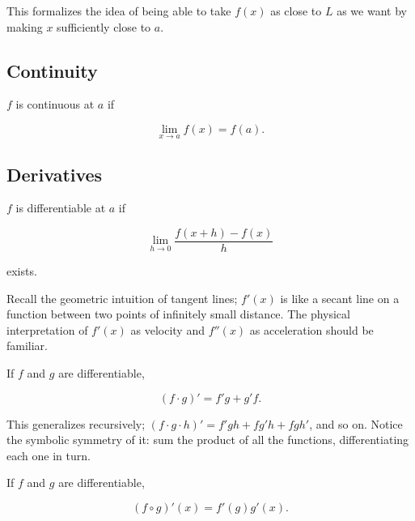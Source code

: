 \documentclass{article}
\begin{document}
This formalizes the idea of being able to take $f(x)$ as close to $L$ as we want
by making $x$ sufficiently close to $a$.

\subsection{Continuity}

\begin{definition}

$f$ is continuous at $a$ if

\begin{equation}
\lim_{x \to a} f(x) = f(a).
\end{equation}

\end{definition}

\subsection{Derivatives}

\begin{definition} 
$f$ is differentiable at $a$ if

\begin{equation}
\lim_{h \to 0} \frac{f(x+h) - f(x)}{h}
\end{equation}

exists.
\end{definition}

Recall the geometric intuition of tangent lines; $f'(x)$ is like a secant line
on a function between two points of infinitely small distance. The physical
interpretation of $f'(x)$ as velocity and $f''(x)$ as acceleration should be familiar.

\begin{theorem} 

If $f$ and $g$ are differentiable, 

\begin{equation}
(f \cdot g)' = f'g + g'f.
\end{equation}


\end{theorem} 

This generalizes recursively; $(f \cdot g \cdot h)' = f'gh + fg'h + fgh'$, and
so on. Notice the symbolic symmetry of it: sum the product of all the functions,
differentiating each one in turn.

\begin{theorem}

If $f$ and $g$ are differentiable,

\begin{equation}
(f \circ g)'(x) = f'(g)g'(x).
\end{equation}


\end{theorem}
\end{document}
